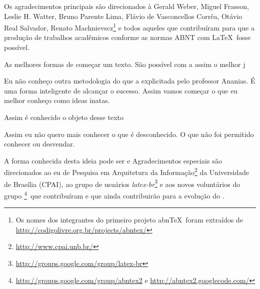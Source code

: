 \begin{agradecimentos}
Os agradecimentos principais são direcionados à Gerald Weber, Miguel Frasson,
Leslie H. Watter, Bruno Parente Lima, Flávio de Vasconcellos Corrêa, Otávio Real
Salvador, Renato Machnievscz\footnote{Os nomes dos integrantes do primeiro
projeto abn\TeX\ foram extraídos de
\url{http://codigolivre.org.br/projects/abntex/}} e todos aqueles que
contribuíram para que a produção de trabalhos acadêmicos conforme
as normas ABNT com \LaTeX\ fosse possível.

As melhores formas de começar um texto. São possível com a assim o melhor j

Eu não conheço outra metodologia do que a explicitada pelo professor Ananias. É uma forma inteligente de alcançar o sucesso.
Assim vamos começar o que eu melhor conheço como ideas inatas.

Assim é conhecido o objeto desse texto

Assim eu não quero mais conhecer o que é desconhecido. O que não foi permitido conhecer ou desvendar.

A forma conhecida desta ideia pode ser e
Agradecimentos especiais são direcionados ao eu de Pesquisa em Arquitetura
da Informação\footnote{\url{http://www.cpai.unb.br/}} da Universidade de
Brasília (CPAI), ao grupo de usuários
\emph{latex-br}\footnote{\url{http://groups.google.com/group/latex-br}} e aos
novos voluntários do grupo
\emph{\abnTeX}\footnote{\url{http://groups.google.com/group/abntex2} e
\url{http://abntex2.googlecode.com/}}~que contribuíram e que ainda
contribuirão para a evolução do \abnTeX.


\end{agradecimentos}


